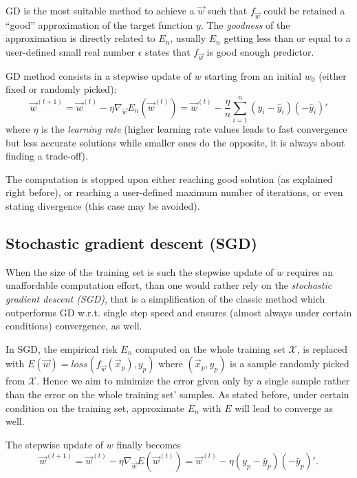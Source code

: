 \documentclass[a4paper,12pt]{article}
\theoremstyle{newplanestyle}
\theoremstyle{newdefinitionstyle}
\theoremstyle{newprovestyle}
\begin{document}
GD is the most suitable method to achieve a $\vec{w}$ such that $f_{\vec{w}}$ could be retained a ``good'' approximation of the target function $y$. The \textit{goodness} of the approximation is directly related to $E_n$, usually $E_n$ getting less than or equal to a user-defined small real number $\epsilon$ states that $f_{\vec{w}}$ is good enough predictor.

GD method consists in a stepwise update of $w$ starting from an initial $w_0$ (either fixed or randomly picked):
\begin{equation*}
\vec{w}^{(t+1)} = \vec{w}^{(t)}-\eta \nabla_{\vec{w}} E_n(\vec{w}^{(t)})
= \vec{w}^{(t)} - \frac{\eta}{n} \sum_{i=1}^{n}(y_i - \hat{y}_i)(-\hat{y}_i)'
\end{equation*}
where $\eta$ is the \textit{learning rate} (higher learning rate values leads to fast convergence but less accurate solutions while smaller ones do the opposite, it is always about finding a trade-off).

The computation is stopped upon either reaching good solution (as explained right before), or reaching a user-defined maximum number of iterations, or even stating divergence (this case may be avoided).

\subsection*{Stochastic gradient descent (SGD)}
When the size of the training set is such the stepwise update of $w$ requires an unaffordable computation effort, than one would rather rely on the \textit{stochastic gradient descent (SGD)}, that is a simplification of the classic method which outperforms GD w.r.t. single step speed and ensures (almost always under certain conditions) convergence, as well.

In SGD, the empirical risk $E_n$ computed on the whole training set $\mathcal{X}$, is replaced with $E(\vec{w})=loss(f_{\vec{w}}(\vec{x}_p),y_p)$ where $(\vec{x}_p, y_p)$ is a sample randomly picked from $\mathcal{X}$. Hence we aim to minimize the error given only by a single sample rather than the error on the whole training set' samples. As stated before, under certain condition on the training set, approximate $E_n$ with $E$ will lead to converge as well.

The stepwise update of $w$ finally becomes
\[
\vec{w}^{(t+1)}=\vec{w}^{(t)}-\eta \nabla_{\vec{w}} E(\vec{w}^{(t)})=\vec{w}^{(t)}-\eta(y_p - \hat{y}_p)(-\hat{y}_p)'.
\]
\end{document}
